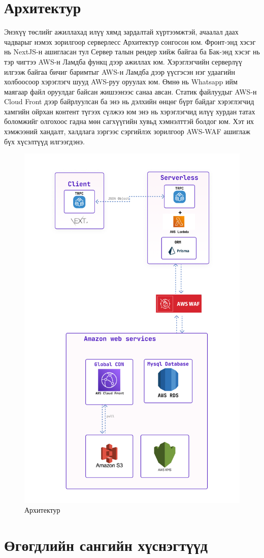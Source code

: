 \section{Архитектур}
Энэхүү төслийг ажиллахад илүү хямд зардалтай хүртээмжтэй, ачаалал даах чадварыг нэмэх зорилгоор серверлесс Архитектур сонгосон юм. Фронт-энд хэсэг нь NextJS-н ашигласан тул Сервер талын рендер хийж байгаа ба Бак-энд хэсэг нь тэр чигтээ AWS-н Ламдба функц дээр ажиллах юм. Хэрэглэгчийн серверлүү илгээж байгаа бичиг баримтыг AWS-н Ламдба дээр үүсгэсэн нэг удаагийн холбоосоор хэрэглэгч шууд AWS-руу оруулах юм. Өмнө нь Whatsapp ийм маягаар файл оруулдаг байсан жишээнээс санаа авсан. Статик файлуудыг AWS-н Cloud Front дээр байрлуулсан ба энэ нь дэлхийн өнцөг бүрт байдаг хэрэглэгчид хамгийн ойрхан контент түгээх сүлжээ юм энэ нь хэрэглэгчид илүү хурдан татах боломжийг олгохоос гадна мөн сагхүүгийн хувьд хэмнэлттэй болдог юм. Хэт их хэмжээний хандалт, халдлага зэргээс сэргийлэх зорилгоор AWS-WAF ашиглаж бүх хүсэлтүүд илгээгдэнэ.
\begin{figure}[h!]
	\centering
	\includegraphics[scale=0.32]{assets/server.png}
	\caption{Архитектур}
	\label{fig:architecture}
\end{figure}
\pagebreak
\newpage
\section{Өгөгдлийн сангийн хүснэгтүүд}

\pagebreak
\newpage

